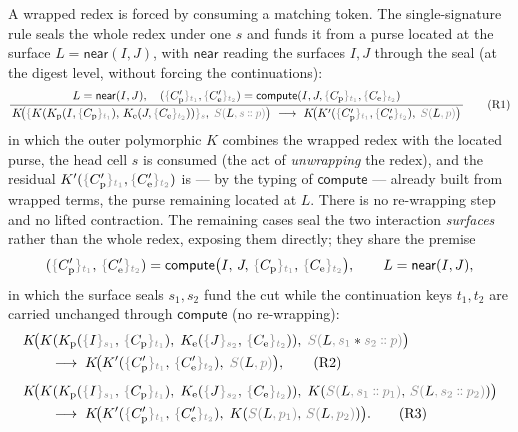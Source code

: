 \documentclass[11pt]{article}
\theoremstyle{definition}
\theoremstyle{plain}
\newcommand{\dec}[1]{\textcolor{costgray}{#1}}   %
\newcommand{\tok}[1]{\dec{#1}}                   %
\newcommand{\near}{\mathsf{near}}
\newcommand{\lstk}[2]{\dec{S(}{#1}\dec{,}\,#2\dec{)}}  %
\newcommand{\sgn}[2]{\dec{\{}{#1}\dec{\}_{#2}}}  %
\newcommand{\cons}{\mathbin{\dec{\dblcolon}}}  %
\newcommand{\red}{\longrightarrow}
\newcommand{\compute}{\mathsf{compute}}
\newcommand{\Kp}{K_{\mathrm{p}}}
\newcommand{\Ke}{K_{\mathrm{e}}}
\begin{document}
A wrapped redex is forced by consuming a matching token. The
single-signature rule seals the whole redex under one $s$ and funds it
from a purse located at the surface $L = \near(I,J)$, with $\near$ reading
the surfaces $I,J$ through the seal (at the digest level, without forcing
the continuations):
%
\begin{equation}
  \frac{L = \near(I,J),\quad
        (\sgn{C_{\mathrm p}'}{t_1},\sgn{C_{\mathrm e}'}{t_2})
          = \compute(I,J,\sgn{C_{\mathrm p}}{t_1},\sgn{C_{\mathrm e}}{t_2})}
       {\,K\!\bigl(\sgn{K(\Kp(I,\sgn{C_{\mathrm p}}{t_1}),\,
                          \Ke(J,\sgn{C_{\mathrm e}}{t_2}))}{s},
        \; \lstk{L}{\tok{s} \cons \tok{p}}\bigr)
        \ \red\
        K\!\bigl(K'(\sgn{C_{\mathrm p}'}{t_1},\sgn{C_{\mathrm e}'}{t_2}),
        \; \lstk{L}{\tok{p}}\bigr)\,}
  \tag{R1}
  \label{eq:R1}
\end{equation}
%
in which the outer polymorphic $K$ combines the wrapped redex with the
located purse, the head cell $s$ is consumed (the act of \emph{unwrapping}
the redex), and the residual $K'(\sgn{C_{\mathrm p}'}{t_1},\sgn{C_{\mathrm
e}'}{t_2})$ is --- by the typing of $\compute$ --- already built from
wrapped terms, the purse remaining located at $L$. There is no re-wrapping
step and no lifted contraction. The remaining cases seal the two
interaction \emph{surfaces} rather than the whole redex, exposing them
directly; they share the premise
%
\[
  (\sgn{C_{\mathrm p}'}{t_1},\,\sgn{C_{\mathrm e}'}{t_2})
    = \compute\bigl(I,\,J,\,
        \sgn{C_{\mathrm p}}{t_1},\,\sgn{C_{\mathrm e}}{t_2}\bigr),
  \qquad L = \near(I,J),
\]
%
in which the surface seals $s_1,s_2$ fund the cut while the continuation
keys $t_1,t_2$ are carried unchanged through $\compute$ (no re-wrapping):
%
\begin{align}
  &K\!\bigl(K(\Kp(\sgn{I}{s_1},\,\sgn{C_{\mathrm p}}{t_1}),\;
               \Ke(\sgn{J}{s_2},\,\sgn{C_{\mathrm e}}{t_2})),\;
        \lstk{L}{\tok{s_1} * \tok{s_2} \cons \tok{p}}\bigr)
   \notag\\
  &\qquad\red\;
   K\!\bigl(K'(\sgn{C_{\mathrm p}'}{t_1},\,\sgn{C_{\mathrm e}'}{t_2}),\;
        \lstk{L}{\tok{p}}\bigr),
   \tag{R2}\label{eq:R2}\\[4pt]
  &K\!\bigl(K(\Kp(\sgn{I}{s_1},\,\sgn{C_{\mathrm p}}{t_1}),\;
               \Ke(\sgn{J}{s_2},\,\sgn{C_{\mathrm e}}{t_2})),\;
        K(\lstk{L}{\tok{s_1}\cons\tok{p_1}},\,
          \lstk{L}{\tok{s_2}\cons\tok{p_2}})\bigr)
   \notag\\
  &\qquad\red\;
   K\!\bigl(K'(\sgn{C_{\mathrm p}'}{t_1},\,\sgn{C_{\mathrm e}'}{t_2}),\;
        K(\lstk{L}{\tok{p_1}},\,\lstk{L}{\tok{p_2}})\bigr).
   \tag{R3}\label{eq:R3}
\end{align}
\end{document}
